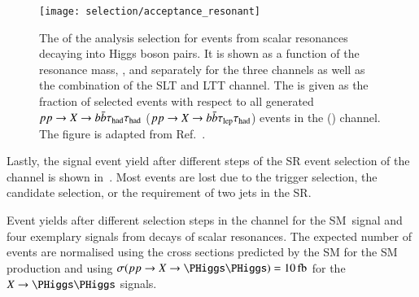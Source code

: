 \begin{figure}[htbp]
  \centering

  \texttt{[image: selection/acceptance\_resonant]}

  \caption[The acceptance times efficiency of the analysis selection for events
  from scalar resonances decaying into Higgs boson pairs.]{The \AccTimesEff of
    the analysis selection for events from scalar resonances decaying into Higgs
    boson pairs. It is shown as a function of the resonance mass, \mX, and
    separately for the three channels as well as the combination of the \lephad
    SLT and LTT channel. The \AccTimesEff is given as the fraction of selected
    events with respect to all generated $pp \to X \to b\bar{b}\tau_{\text{had}}\tau_{\text{had}}$
    ($pp \to X \to b\bar{b}\tau_{\text{lep}}\tau_{\text{had}}$) events in the \hadhad (\lephad) channel. The
    figure is adapted from Ref.~\cite{HDBS-2018-40}.}%
  \label{fig:signal_acceptance_resonant}
\end{figure}

Lastly, the signal event yield after different steps of the SR event selection
of the \hadhad channel is shown in~. Most events are lost due
to the trigger selection, the \tauhadvis candidate selection, or the requirement
of two \btagged jets in the SR.

\begin{sidewaystable}[p]
  \centering

  \caption[Event yields after different selection steps in the \hadhad channel
  for the SM~\HH signal and four exemplary signals from decays of scalar
  resonances.]{Event yields after different selection steps in the \hadhad
    channel for the SM~\HH signal and four exemplary signals from decays of
    scalar resonances. The expected number of events are normalised using the
    cross sections predicted by the SM for the SM \HH production and using
    $\sigma(pp \to X \to \HH) = \SI{10}{\femto\barn}$ for the $X \to \HH$
    signals.}%
  \label{tab:cutflow}

  \resizebox{\textwidth}{!}{
    
  }
\end{sidewaystable}



